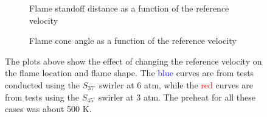 \begin{figure}

\centering

\begin{subfigure}{\linewidth}
  \centering
  
  \caption{Flame standoff distance as a function of the reference velocity}
  \label{fig:referenceVelocityDistance}
\end{subfigure}

\begin{subfigure}{\linewidth}
  \centering
  
  \caption{Flame cone angle as a function of the reference velocity}
  \label{fig:referenceVelocityAngle}
\end{subfigure}

\caption[Effect of Reference Velocity on Flame Location and Shape]{The plots above show the effect of changing the reference velocity on the flame location and flame shape. The \textcolor{blue}{blue} curves are from tests conducted using the \(S_{37^\circ}\) swirler at 6 atm, while the \textcolor{red}{red} curves are from tests using the \(S_{45^\circ}\) swirler at 3 atm. The preheat for all these cases was about 500 K.}

\label{fig:referenceVelocityResults}

\end{figure}


